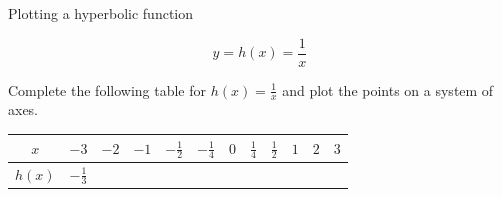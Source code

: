 \begin{wex}
{Plotting a hyperbolic function}
{
\begin{equation*}
 y = h(x) = \frac{1}{x}
\end{equation*}

Complete the following table for $h(x) = \frac{1}{x}$ and plot the points on a system of axes.

\begin{table}[H]
\begin{center}
\begin{tabular}{|c|c|c|c|c|c|c|c|c|c|c|c|}
\hline
  $x$ &  $-3$ & $-2$ & $-1$ & $-\frac{1}{2}$ & $-\frac{1}{4}$ &$0$&$\frac{1}{4}$&$\frac{1}{2}$&$1$&$2$&$3$
\\ \hline
 $h(x)$& $-\frac{1}{3}$ &&&&&&&&&&
\\ \hline
\end{tabular}
\end{center}
\end{table}


}
\end{wex}
